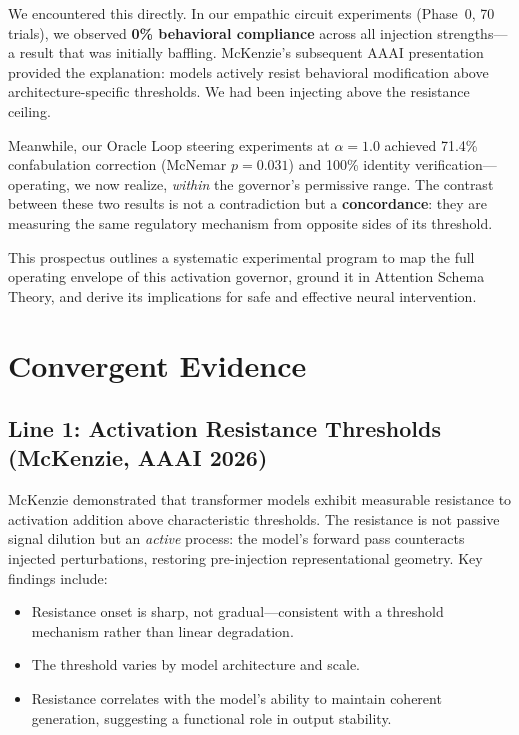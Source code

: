 \documentclass[11pt,letterpaper]{article}
\begin{document}
We encountered this directly. In our empathic circuit experiments (Phase~0, 70 trials), we observed \textbf{0\% behavioral compliance} across all injection strengths---a result that was initially baffling. McKenzie's subsequent AAAI presentation provided the explanation: models actively resist behavioral modification above architecture-specific thresholds. We had been injecting above the resistance ceiling.

Meanwhile, our Oracle Loop steering experiments at $\alpha=1.0$ achieved 71.4\% confabulation correction (McNemar $p=0.031$) and 100\% identity verification---operating, we now realize, \emph{within} the governor's permissive range. The contrast between these two results is not a contradiction but a \textbf{concordance}: they are measuring the same regulatory mechanism from opposite sides of its threshold.

This prospectus outlines a systematic experimental program to map the full operating envelope of this activation governor, ground it in Attention Schema Theory, and derive its implications for safe and effective neural intervention.

\section{Convergent Evidence}

\subsection{Line 1: Activation Resistance Thresholds (McKenzie, AAAI 2026)}

McKenzie demonstrated that transformer models exhibit measurable resistance to activation addition above characteristic thresholds. The resistance is not passive signal dilution but an \emph{active} process: the model's forward pass counteracts injected perturbations, restoring pre-injection representational geometry. Key findings include:
\begin{itemize}[nosep]
  \item Resistance onset is sharp, not gradual---consistent with a threshold mechanism rather than linear degradation.
  \item The threshold varies by model architecture and scale.
  \item Resistance correlates with the model's ability to maintain coherent generation, suggesting a functional role in output stability.
\end{itemize}
\end{document}
